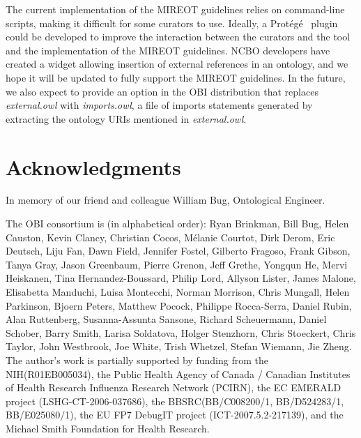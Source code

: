 \documentclass{ao2e}%
\newcommand{\protege}{Prot\'{e}g\'{e}}
\begin{document}
The current implementation of the \ac{MIREOT} guidelines relies on command-line scripts, making it difficult for some curators to use.
Ideally, a \protege\ \cite{RefWorks:1501} plugin could be developed to improve the interaction between the curators and the tool and the implementation of the MIREOT guidelines. NCBO developers have created a widget allowing insertion of external references in an ontology\cite{NCBOWidget}, and we hope it will be updated to fully support the MIREOT guidelines.
In the future, we also expect to provide an option in the OBI distribution that replaces \emph{external.owl} with \emph{imports.owl}, a file of imports statements generated by extracting the ontology URIs mentioned in \emph{external.owl}.%


\section*{Acknowledgments}

In memory of our friend and colleague William Bug, Ontological Engineer. 

The OBI consortium is (in alphabetical order): Ryan Brinkman, Bill Bug, Helen Causton, Kevin Clancy, Christian Cocos, M\'elanie Courtot, Dirk Derom, Eric Deutsch, Liju Fan, Dawn Field, Jennifer Fostel, Gilberto Fragoso, Frank Gibson, Tanya Gray, Jason Greenbaum, Pierre Grenon, Jeff Grethe, Yongqun He, Mervi Heiskanen, Tina Hernandez-Boussard, Philip Lord, Allyson Lister, James Malone, Elisabetta Manduchi, Luisa Montecchi, Norman Morrison, Chris Mungall, Helen Parkinson, Bjoern Peters, Matthew Pocock, Philippe Rocca-Serra, Daniel Rubin, Alan Ruttenberg, Susanna-Assunta Sansone, Richard Scheuermann, Daniel Schober, Barry Smith, Larisa Soldatova, Holger Stenzhorn, Chris Stoeckert, Chris Taylor, John Westbrook,  Joe White, Trish Whetzel, Stefan Wiemann, Jie Zheng. 
The author's work is partially supported by funding from the NIH(R01EB005034),  the Public Health Agency of Canada / Canadian Institutes of Health Research Influenza Research Network (PCIRN), the EC EMERALD project (LSHG-CT-2006-037686), the BBSRC(BB/C008200/1, BB/D524283/1, BB/E025080/1), the EU FP7 DebugIT project (ICT-2007.5.2-217139), and the Michael Smith Foundation for Health Research.
\end{document}
